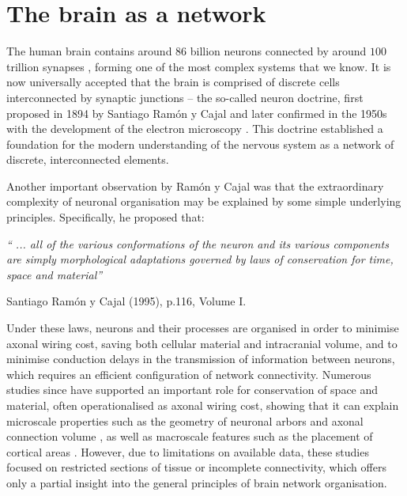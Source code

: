 \section{The brain as a network}
The human brain contains around $86$ billion neurons connected by around $100$ trillion synapses \citep{Williams1988,Andersen1992,Pelvig2008}, forming one of the most complex systems that we know. It is now universally accepted that the brain is comprised of discrete cells interconnected by synaptic junctions -- the so-called neuron doctrine, first proposed in 1894 by Santiago Ram\'{o}n y Cajal \citep{RamonyCajal1995} and later confirmed in the 1950s with the development of the electron microscopy \citep{DeRobertis1955}. This doctrine established a foundation for the modern understanding of the nervous system as a network of discrete, interconnected elements.

Another important observation by Ram\'{o}n y Cajal was that the extraordinary complexity of neuronal organisation may be explained by some simple underlying principles. Specifically, he proposed that:
\bigskip
\bigskip

\textit{`` ... all of the various conformations of the neuron and its various components are simply morphological adaptations governed by laws of conservation for time, space and material''}

\hspace{7.5cm}Santiago Ram\'{o}n y Cajal (1995), p.116, Volume I.
\bigskip
\bigskip

Under these laws, neurons and their processes are organised in order to minimise axonal wiring cost, saving both cellular material and intracranial volume, and to minimise conduction delays in the transmission of information between neurons, which requires an efficient configuration of network connectivity. Numerous studies since have supported an important role for conservation of space and material, often operationalised as axonal wiring cost, showing that it can explain microscale properties such as the geometry of neuronal arbors \citep{Cherniak1999} and axonal connection volume \citep{Chklovskii2002}, as well as macroscale features such as the placement of cortical areas \citep{Cherniak2004}. However, due to limitations on available data, these studies focused on restricted sections of tissue or incomplete connectivity, which offers only a partial insight into the general principles of brain network organisation.

